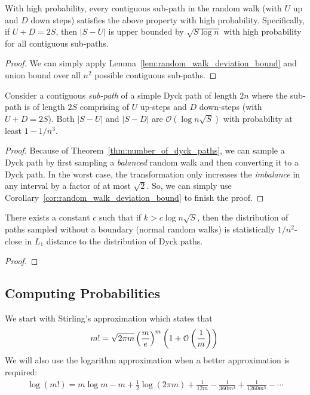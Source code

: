 \begin{corollary}
\label{cor:random_walk_deviation_bound}
With high probability, every contiguous sub-path in the random walk (with $U$ up and $D$ down steps) satisfies the above property with high probability.
Specifically, if $U+D = 2S$, then $|S-U|$ is upper bounded by $\sqrt{S\log n}$ with high probability for all contiguous sub-paths.
\end{corollary}
\begin{proof}
We can simply apply Lemma~\ref{lem:random_walk_deviation_bound} and union bound over all $n^2$ possible contiguous sub-paths.
\end{proof}

\begin{lemma}
\label{lem:dyck_path_deviation_bound}
Consider a contiguous \emph{sub-path} of a simple Dyck path of length $2n$
where the sub-path is of length $2S$ comprising of $U$ up-steps and $D$ down-steps (with $U + D = 2S$).
Both $|S-U|$ and $|S-D|$ are $\mathcal O(\log n\sqrt S)$ with probability at least $1-1/n^3$.
\end{lemma}
\begin{proof}
Because of Theorem~\ref{thm:number_of_dyck_paths}, we can sample a Dyck path
by first sampling a \emph{balanced} random walk and then converting it to a Dyck path.
In the worst case, the transformation only increases the \emph{imbalance} in any interval by a factor of at most $\sqrt2$.
So, we can simply use Corollary~\ref{cor:random_walk_deviation_bound} to finish the proof.
\end{proof}

\begin{lemma}
\label{lem:dyck_path_irrelevant_boundary}
There exists a constant $c$ such that if $k > c\log n\sqrt S$, then the distribution of paths sampled without a boundary
(normal random walks) is statistically $1/n^2$-close in $L_1$ distance to the distribution of Dyck paths.
\end{lemma}
\begin{proof}
\end{proof}



\subsection{Computing Probabilities}%
\label{sub:computing_probabilities}
We start with Stirling's approximation which states that
\[
m! = \sqrt{2\pi m}\left( \frac me\right)^m\left( 1 + \mathcal O\left( \frac 1m\right)\right)\\
\]
We will also use the logarithm approximation when a better approximation is required:
\begin{align}
    \label{eq:log_factorial_approximation}
\log (m!) = m\log m -m + \frac 12 \log(2\pi m) + \frac{1}{12m} - \frac{1}{360m^3} + \frac{1}{1260m^5} - \cdots
\end{align}

